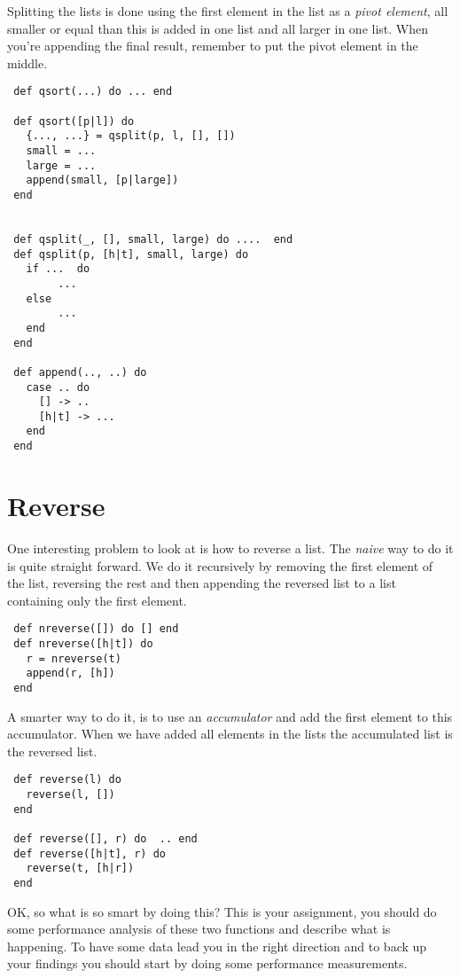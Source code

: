\documentclass[a4paper,11pt]{article}
\begin{document}
Splitting the lists is done using the first element in the list as a
{\em pivot element}, all smaller or equal than this is added in one
list and all larger in one list. When you're appending the final
result, remember to put the pivot element in the middle.

\begin{verbatim}
 def qsort(...) do ... end

 def qsort([p|l]) do 
   {..., ...} = qsplit(p, l, [], [])
   small = ...
   large = ...
   append(small, [p|large])
 end


 def qsplit(_, [], small, large) do ....  end
 def qsplit(p, [h|t], small, large) do
   if ...  do
        ...
   else
        ...
   end
 end

 def append(.., ..) do
   case .. do
     [] -> ..
     [h|t] -> ...
   end
 end

\end{verbatim}

\section{Reverse}

One interesting problem to look at is how to reverse a list. The {\em
  naive} way to do it is quite straight forward. We do it recursively
by removing the first element of the list, reversing the rest and then
appending the reversed list to a list containing only the first element.

\begin{verbatim}
 def nreverse([]) do [] end
 def nreverse([h|t]) do 
   r = nreverse(t)
   append(r, [h])
 end
\end{verbatim}

A smarter way to do it, is to use an {\em accumulator} and add the
first element to this accumulator. When we have added all elements in
the lists the accumulated list is the reversed list.

\begin{verbatim}
 def reverse(l) do
   reverse(l, [])
 end

 def reverse([], r) do  .. end
 def reverse([h|t], r) do  
   reverse(t, [h|r]) 
 end
\end{verbatim}

OK, so what is so smart by doing this? This is your assignment, you
should do some performance analysis of these two functions and
describe what is happening. To have some data lead you in the right
direction and to back up your findings you should start by doing some
performance measurements.
\end{document}
